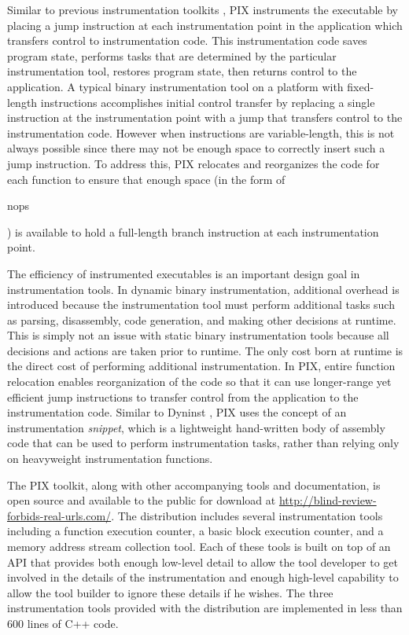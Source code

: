 Similar to previous instrumentation toolkits \cite{buck2000api}, PIX instruments the executable 
by placing a jump instruction at each instrumentation
point in the application which transfers control to instrumentation code. This instrumentation code saves
program state, performs tasks that are determined by the particular instrumentation tool,
restores program state, then returns control to the application.
A typical binary instrumentation tool on a platform with fixed-length instructions 
\cite{tikir2006pmac} accomplishes initial control transfer by replacing a
single instruction at the instrumentation point with a jump that transfers
control to the instrumentation code. However when instructions are variable-length,
this is not always possible since there may not be enough space to correctly 
insert such a jump instruction. To address this, PIX
relocates and reorganizes the code for each function to ensure that enough
space (in the form of \begin{it}nops\end{it}) is available to hold a full-length branch instruction at each
instrumentation point.

The efficiency of instrumented executables is an important design goal in instrumentation tools. In dynamic binary instrumentation,
additional overhead is introduced because the instrumentation tool must perform additional tasks such 
as parsing, disassembly, code generation, and making other decisions at runtime. This
is simply not an issue with static binary instrumentation tools because all
decisions and actions are taken prior to runtime. The only cost born at runtime is the direct
cost of performing additional instrumentation. In PIX, entire function relocation
enables reorganization of the code so that it
can use longer-range yet efficient jump instructions to transfer control from the
application to the instrumentation code. Similar to Dyninst \cite{buck2000api}, PIX uses the concept of an
instrumentation \textit{snippet}, which is a lightweight hand-written body of assembly code that can
be used to perform instrumentation tasks, rather than relying only on heavyweight
instrumentation functions.

The PIX toolkit, along with other accompanying tools and documentation,
is open source and available to the public for download 
at \url{http://blind-review-forbids-real-urls.com/}. The distribution includes several instrumentation tools 
including a function execution counter, a basic block
execution counter, and a memory address stream collection tool. Each of these tools is built on top of
an API that provides both enough low-level detail to allow the tool developer to get involved in the 
details of the instrumentation and enough high-level capability to allow the tool builder
to ignore these details if he wishes. The three instrumentation tools provided with the distribution are implemented in
less than 600 lines of C++ code.

